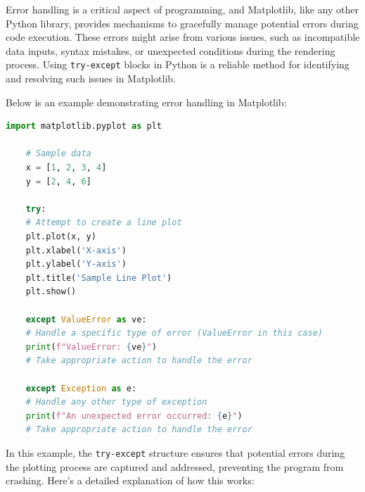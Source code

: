 Error handling is a critical aspect of programming, and Matplotlib, like any other Python library, provides mechanisms to gracefully manage potential errors during code execution. These errors might arise from various issues, such as incompatible data inputs, syntax mistakes, or unexpected conditions during the rendering process. Using \texttt{try-except} blocks in Python is a reliable method for identifying and resolving such issues in Matplotlib.

Below is an example demonstrating error handling in Matplotlib:

\begin{lstlisting}[language=Python]
	import matplotlib.pyplot as plt
	
	# Sample data
	x = [1, 2, 3, 4]
	y = [2, 4, 6]
	
	try:
	# Attempt to create a line plot
	plt.plot(x, y)
	plt.xlabel('X-axis')
	plt.ylabel('Y-axis')
	plt.title('Sample Line Plot')
	plt.show()
	
	except ValueError as ve:
	# Handle a specific type of error (ValueError in this case)
	print(f"ValueError: {ve}")
	# Take appropriate action to handle the error
	
	except Exception as e:
	# Handle any other type of exception
	print(f"An unexpected error occurred: {e}")
	# Take appropriate action to handle the error
\end{lstlisting}

In this example, the \texttt{try-except} structure ensures that potential errors during the plotting process are captured and addressed, preventing the program from crashing. Here’s a detailed explanation of how this works:


